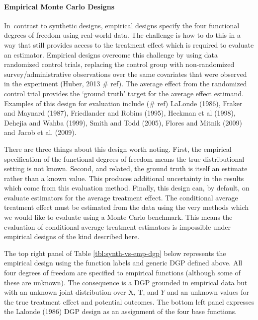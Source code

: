 \documentclass[../main.tex]{subfiles}
\begin{document}
\vspace{\baselineskip}
\paragraph*{Empirical Monte Carlo Designs}\par


\vspace{\baselineskip}
In\ contrast to synthetic designs, empirical designs specify the four functional degrees of freedom using real-world data. The challenge is how to do this in a way that still provides access to the treatment effect which is required to evaluate an estimator. Empirical designs overcome this challenge by using data randomized control trials, replacing the control group with non-randomized survey/administrative observations over the same covariates that were observed in the experiment (Huber, 2013 $\#$ ref). The average effect from the randomized control trial provides the ‘ground truth’ target for the average effect estimand. Examples of this design for evaluation include ($\#$ ref) LaLonde (1986), Fraker and Maynard (1987), Friedlander and Robins (1995), Heckman et al (1998), Dehejia and Wahba (1999), Smith and Todd (2005),  Flores and Mitnik (2009) and Jacob et al. (2009).\par


\vspace{\baselineskip}
There are three things about this design worth noting. First, the empirical specification of the functional degrees of freedom means the true distributional setting is not known. Second, and related, the ground truth is itself an estimate rather than a known value. This produces additional uncertainty in the results which come from this evaluation method. Finally, this design can, by default, on evaluate estimators for the average treatment effect. The conditional average treatment effect must be estimated from the data using the very methods which we would like to evaluate using a Monte Carlo benchmark. This means the evaluation of conditional average treatment estimators is impossible under empirical designs of the kind described here.\par


\vspace{\baselineskip}
The top right panel of Table \ref{tbl:synth-vs-emp-dgp} below represents the empirical design using the function labels and generic DGP defined above. All four degrees of freedom are specified to empirical functions (although some of these are unknown). The consequence is a DGP grounded in empirical data but with an unknown joint distribution over  \( \text{X, T,} \) and  \( Y \) and an unknown values for the true treatment effect and potential outcomes. The bottom left panel expresses the Lalonde (1986) DGP design as an assignment of the four base functions.\par
\end{document}
